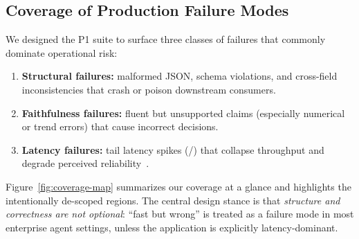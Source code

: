 \subsection{Coverage of Production Failure Modes}

We designed the P1 suite to surface three classes of failures that commonly dominate operational risk:

\begin{enumerate}[leftmargin=12pt]
    \item \textbf{Structural failures:} malformed JSON, schema violations, and cross-field inconsistencies that crash or poison downstream consumers.
    \item \textbf{Faithfulness failures:} fluent but unsupported claims (especially numerical or trend errors) that cause incorrect decisions.
    \item \textbf{Latency failures:} tail latency spikes (\pninetyfive/\pninetynine) that collapse throughput and degrade perceived reliability~\citep{dean2013tail}.
\end{enumerate}

Figure~\ref{fig:coverage-map} summarizes our coverage at a glance and highlights the intentionally de-scoped regions. The central design stance is that \emph{structure and correctness are not optional}: ``fast but wrong'' is treated as a failure mode in most enterprise agent settings, unless the application is explicitly latency-dominant.

